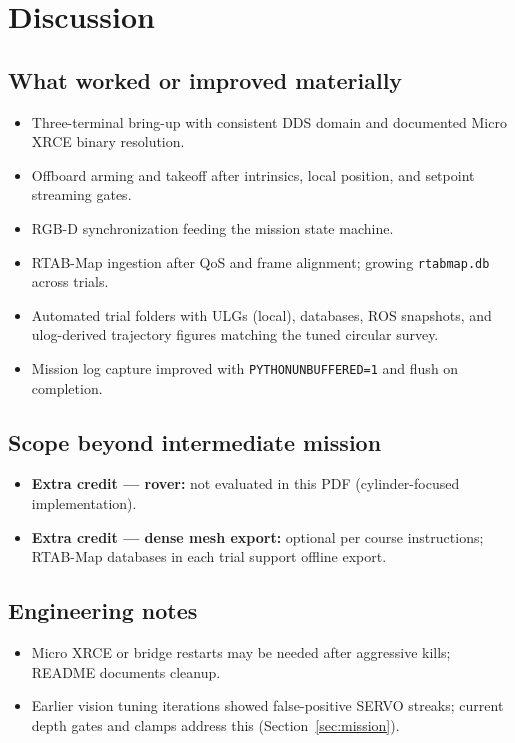 \documentclass[11pt]{article}
\begin{document}
\newpage
\section{Discussion}
\subsection{What worked or improved materially}
\begin{itemize}[itemsep=2pt]
    \item Three-terminal bring-up with consistent DDS domain and documented Micro XRCE binary resolution.
    \item Offboard arming and takeoff after intrinsics, local position, and setpoint streaming gates.
    \item RGB-D synchronization feeding the mission state machine.
    \item RTAB-Map ingestion after QoS and frame alignment; growing \texttt{rtabmap.db} across trials.
    \item Automated trial folders with ULGs (local), databases, ROS snapshots, and ulog-derived trajectory figures matching the tuned circular survey.
    \item Mission log capture improved with \texttt{PYTHONUNBUFFERED=1} and flush on completion.
\end{itemize}

\subsection{Scope beyond intermediate mission}
\begin{itemize}[itemsep=2pt]
    \item \textbf{Extra credit — rover:} not evaluated in this PDF (cylinder-focused implementation).
    \item \textbf{Extra credit — dense mesh export:} optional per course instructions; RTAB-Map databases in each trial support offline export.
\end{itemize}

\subsection{Engineering notes}
\begin{itemize}[itemsep=2pt]
    \item Micro XRCE or bridge restarts may be needed after aggressive kills; README documents cleanup.
    \item Earlier vision tuning iterations showed false-positive SERVO streaks; current depth gates and clamps address this (Section~\ref{sec:mission}).
\end{itemize}
\end{document}

